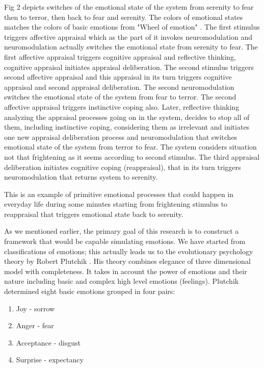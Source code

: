 Fig 2 depicts switches of the emotional state of the system from serenity to fear then to terror, then back to fear and serenity. The colors of emotional states matches the colors of basic emotions from "Wheel of emotion" \cite{natureofemotions}. The first stimulus triggers affective appraisal which as the part of it invokes neuromodulation and neuromodulation actually switches the emotional state from serenity to fear. The first affective appraisal triggers cognitive appraisal and reflective thinking, cognitive appraisal initiates appraisal deliberation. The second stimulus triggers second affective appraisal and this appraisal in its turn triggers cognitive appraisal and second appraisal deliberation. The second neuromodulation switches the emotional state of the system from fear to terror. The second affective appraisal triggers instinctive coping also. Later, reflective thinking analyzing the appraisal processes going on in the system, decides to stop all of them, including instinctive coping, considering them as irrelevant and initiates one new appraisal deliberation process and neuromodulation that switches emotional state of the system from terror to fear. The system considers situation not that frightening as it seems according to second stimulus. The third appraisal deliberation initiates cognitive coping (reappraisal), that in its turn triggers neuromodulation that returns system to serenity.

This is an example of primitive emotional processes that could happen in everyday life during some minutes starting from frightening stimulus to reappraisal that triggers emotional state back to serenity.

As we mentioned earlier, the primary goal of this research is to construct a framework that would be capable simulating emotions. We have started from classifications of emotions; this actually leads us to the evolutionary psychology theory by Robert Plutchik \cite{natureofemotions}. His theory combines elegance of three dimensional model with completeness. It takes in account the power of emotions and their nature including basic and complex high level emotions (feelings). Plutchik determined eight basic emotions grouped in four pairs:

\begin{enumerate}
 \item  Joy - sorrow
 \item  Anger - fear
 \item  Acceptance - disgust
 \item  Surprise - expectancy
\end{enumerate}


